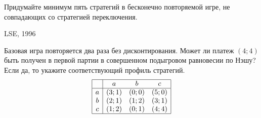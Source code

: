 \begin{problem}

Придумайте минимум пять стратегий в бесконечно повторяемой игре, не совпадающих со стратегией переключения.



\begin{sol}

\end{sol}
\end{problem}



\begin{problem}
\begin{source}
LSE, 1996
\end{source}
Базовая игра повторяется два раза без дисконтирования. Может ли платеж  $\left(4;4\right)$  быть получен в первой партии в совершенном подыгровом равновесии по Нэшу? Если да, то укажите соответствующий профиль стратегий.
\[\begin{array}{|c|ccc|}  \hline {} & {a} & {b} & {c} \\  \hline {a} & {\left(3;1\right)} & {\left(0;0\right)} & {\left(5;0\right)} \\ {b} & {\left(2;1\right)} & {\left(1;2\right)} & {\left(3;1\right)} \\ {c} & {\left(1;2\right)} & {\left(0;1\right)} & {\left(4;4\right)} \\  \hline  \end{array}\]



\begin{sol}

\end{sol}
\end{problem}



